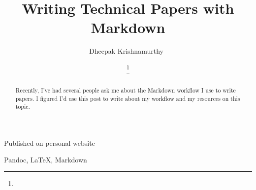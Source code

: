 \documentclass[journal,10pt,final]{IEEEtran}
\begin{document}
\title{\bigskip \bigskip Writing Technical Papers with Markdown}

\author{ Dheepak Krishnamurthy~\IEEEmembership{} \and  %
\thanks{}%
}


%
{Published on personal website}

% 




%





\maketitle


\begin{abstract}

\noindent Recently, I've had several people ask me about the Markdown workflow I
use to write papers. I figured I'd use this post to write about my
workflow and my resources on this topic.

\end{abstract}



%
\IEEEpeerreviewmaketitle

\begin{IEEEkeywords}
Pandoc, LaTeX, Markdown
\end{IEEEkeywords}
\end{document}
